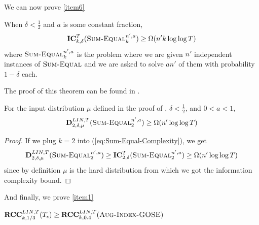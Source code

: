 \documentclass{toc}
\newcommand{\ic}{\ensuremath{\mathbf{IC}}}
\newcommand{\rcclinT}{\ensuremath{\mathbf{RCC}^{LIN,T}}}
\newcommand{\DlinT}{\ensuremath{\mathbf{D}^{LIN,T}}}
\newcommand{\sumequal}{\textsc{Sum-Equal} }
\newcommand{\auggo}{\textsc{Aug-Index-GOSE}}
\begin{document}
%
{\color{black} We can now prove \ref{item6}}

\begin{theorem}
When $\delta < \frac{1}{2}$ and $a$ is some constant fraction,
\begin{equation}
    \ic^T_{k,\delta}(\sumequal_k^{n',a}) \ge \Omega(n'k \log \log T)
    \label{eq:Sum-Equal-Complexity}
\end{equation}
where $\sumequal_k^{n',a}$ is the problem where we are given $n'$ independent instances of $\sumequal$ and we are asked to solve $an'$ of them with probability $1-\delta$ each.
\label{thm:woodruff}
\end{theorem}
The proof of this theorem can be found in .

\begin{corollary}
For the input distribution $\mu$ defined in the proof of , $\delta < \frac{1}{2}$, and $0<a<1$,
$$\DlinT_{2,\delta,\mu}(\sumequal_2^{n',a}) \ge \Omega(n' \log \log T)$$
\end{corollary}
\begin{proof}
If we plug $k=2$ into (\ref{eq:Sum-Equal-Complexity}), we get
$$\DlinT_{2,\delta,\mu}(\sumequal_2^{n',a}) \ge \ic^T_{2,\delta}(\sumequal_2^{n',a}) \ge \Omega(n' \log \log T)$$
since by definition $\mu$ is the hard distribution
%
{}from which we got the information complexity bound.  %
\end{proof}

%
{\color{black} And finally, we prove \ref{item1}}

\begin{theorem}
$\rcclinT_{k,1/3}(T_\epsilon) \ge \rcclinT_{k,0.4}(\auggo)$
\end{theorem}
\end{document}

